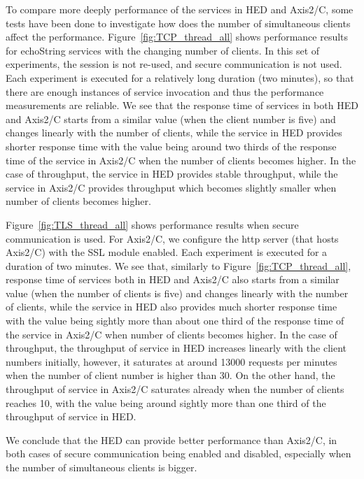 \documentclass[conference]{IEEEtran}
\begin{document}
To compare more deeply performance of the services in HED and Axis2/C, some
tests have been done to investigate how does the number of simultaneous clients affect
the performance. Figure~\ref{fig:TCP_thread_all} shows performance results for echoString
services with the changing number of clients. In this set of experiments, the session is not re-used, and secure
communication is not used. Each experiment is executed for a relatively long duration (two minutes),
so that there are enough instances of service invocation and thus the performance measurements are
reliable. We see that the response time of services in both HED and Axis2/C starts from a
similar value (when the client number is five) and changes linearly with the number of
clients, while the service in HED provides shorter response time with the value being around two thirds of the
response time of the service in Axis2/C when the number of clients becomes higher.
In the case of throughput, the service in HED provides stable throughput, while
the service in Axis2/C provides throughput which  becomes slightly smaller when number of clients becomes
higher.

Figure~\ref{fig:TLS_thread_all} shows performance results when secure
communication is used. For Axis2/C, we configure the http server (that hosts Axis2/C) with the SSL
module enabled. Each experiment is executed for a duration of two minutes.
We see that, similarly to Figure~\ref{fig:TCP_thread_all}, response
time of services both in HED and Axis2/C also starts from a similar value (when the number of
clients is five) and changes linearly with the number of clients, while the service in HED also provides much shorter
response time with the value being sightly more than about one third of the response time of
the service in Axis2/C when  number of clients becomes higher.
In the case of throughput, the throughput of service in HED increases linearly
with the client numbers initially, however, it saturates at around 13000 requests per
minutes when the number  of client number is higher than 30. On the other hand, the throughput of service in
Axis2/C saturates already when the number of clients reaches 10, with
the value being around sightly more than one third of the throughput of service in HED.

We conclude that the HED can provide better performance than Axis2/C, in both
cases of secure communication being enabled and disabled, especially when the number of
simultaneous clients is bigger.
\end{document}
